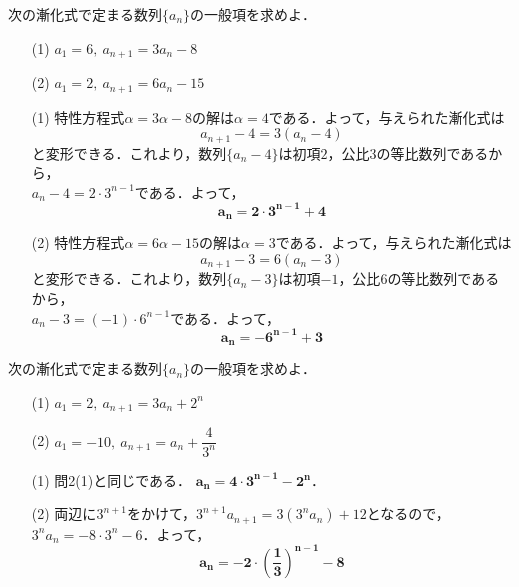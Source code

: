 \documentclass[a4paper,11pt]{ltjsarticle}
\begin{document}
\newpage
{}
\begin{toi}
次の漸化式で定まる数列$\{a_n\}$の一般項を求めよ．\\
\begin{minipage}{0.5\linewidth}
\begin{itemize}
    \item [(1)]$a_1=6,~a_{n+1}=3a_n-8$
\end{itemize}
\end{minipage}
\begin{minipage}{0.5\linewidth}
\begin{itemize}
    \item [(2)]$a_1=2,~a_{n+1}=6a_n-15$
\end{itemize}
\end{minipage}
\end{toi}
\ans 
\begin{itemize}
    \item [(1)]特性方程式$\alpha=3\alpha-8$の解は$\alpha=4$である．よって，与えられた漸化式は
    \[a_{n+1}-4=3(a_n-4)\]
    と変形できる．これより，数列$\{a_n-4\}$は初項$2$，公比$3$の等比数列であるから，\\$a_n-4=2\cdot3^{n-1}$である．よって，
    \[\boldsymbol{a_n=2\cdot3^{n-1}+4}\]

\item[(2)] 特性方程式$\alpha=6\alpha-15$の解は$\alpha=3$である．よって，与えられた漸化式は
    \[a_{n+1}-3=6(a_n-3)\]
    と変形できる．これより，数列$\{a_n-3\}$は初項$-1$，公比$6$の等比数列であるから，\\$a_n-3=(-1)\cdot6^{n-1}$である．よって，
    \[\boldsymbol{a_n=-6^{n-1}+3}\]
\end{itemize}


\begin{toi}
次の漸化式で定まる数列$\{a_n\}$の一般項を求めよ．\\
\begin{minipage}{0.5\linewidth}
\begin{itemize}
    \item [(1)]$a_1=2,~a_{n+1}=3a_n+2^n$
\end{itemize}
\end{minipage}
\begin{minipage}{0.5\linewidth}
\begin{itemize}
    \item [(2)]$a_1=-10,~a_{n+1}=a_n+\dfrac{4}{3^n}$
\end{itemize}
\end{minipage}
\end{toi}
\ans 
\begin{itemize}
    \item [(1)]問2(1)と同じである． $\boldsymbol{a_n=4\cdot3^{n-1}-2^n}$．

\item[(2)]両辺に$3^{n+1}$をかけて，$3^{n+1}a_{n+1}=3(3^na_n)+12$となるので，$3^na_n=-8\cdot 3^n-6$．よって，
\[\boldsymbol{a_n=-2\cdot\left(\frac13\right)^{n-1}-8}\]

\end{itemize}
\end{document}
